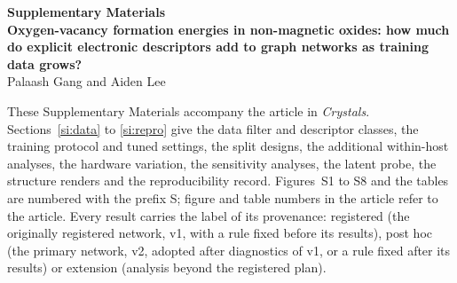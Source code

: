 \documentclass[10pt]{article}
\begin{document}
\begin{center}
{\large\bfseries Supplementary Materials}\\[6pt]
{\bfseries Oxygen-vacancy formation energies in non-magnetic oxides: how much do explicit electronic descriptors
add to graph networks as training data grows?}\\[6pt]
Palaash Gang and Aiden Lee
\end{center}

\vspace{6pt}
\noindent\begin{minipage}{\linewidth}\small
These Supplementary Materials accompany the article in \textit{Crystals}. Sections~\ref{si:data} to
\ref{si:repro} give the data filter and descriptor classes, the training protocol and tuned settings, the split
designs, the additional within-host analyses, the hardware variation, the sensitivity analyses, the latent probe,
the structure renders and the reproducibility record. Figures~S1 to S8 and the tables are numbered with the
prefix S; figure and table numbers in the article refer to the article. Every result carries the label of
its provenance: registered (the originally registered network, v1, with a rule fixed before its results), post
hoc (the primary network, v2, adopted after diagnostics of v1, or a rule fixed after its results) or extension
(analysis beyond the registered plan).
\end{minipage}











\FloatBarrier


\end{document}
